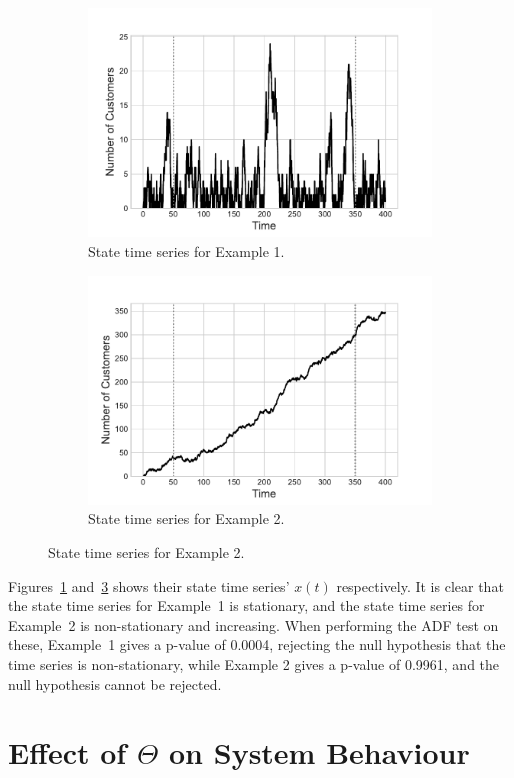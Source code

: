 \documentclass{article}
\begin{document}
\begin{figure}[!htbp]
  \begin{center}
  \begin{subfigure}[b]{0.45\textwidth}
    \includegraphics[width=\textwidth]{img/adf_test_steadystate.pdf}
    \caption{State time series for Example 1.}
    \label{fig:timeseries1}
  \end{subfigure}
  \begin{subfigure}[b]{0.45\textwidth}
    \includegraphics[width=\textwidth]{img/adf_test_not_steadystate.pdf}
    \caption{State time series for Example 2.}
    \label{fig:timeseries2}
  \end{subfigure}
  \end{center}
\end{figure}


Figures~\ref{fig:timeseries1} and~\ref{fig:timeseries2} shows their state time
series' $x(t)$ respectively. It is clear that the state time series for
Example~1 is stationary, and the state time series for Example~2 is
non-stationary and increasing. When performing the ADF test on these, Example~1
gives a p-value of 0.0004, rejecting the null hypothesis that the time series is
non-stationary, while Example 2 gives a p-value of 0.9961, and the null
hypothesis cannot be rejected.


\section{Effect of $\Theta$ on System Behaviour}\label{sec:behaviour}





\end{document}

